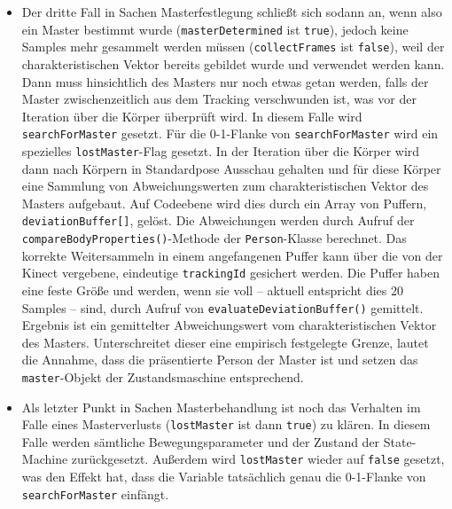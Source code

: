 \begin{itemize}
\item Der dritte Fall in Sachen Masterfestlegung schließt sich sodann an, wenn also ein Master bestimmt wurde (\texttt{masterDetermined} ist \texttt{true}), jedoch keine Samples mehr gesammelt werden müssen (\texttt{collectFrames} ist \texttt{false}), weil der charakteristischen Vektor bereits gebildet wurde und verwendet werden kann. Dann muss hinsichtlich des Masters nur noch etwas getan werden, falls der Master zwischenzeitlich aus dem Tracking verschwunden ist, was vor der Iteration über die Körper überprüft wird. In diesem Falle wird \texttt{searchForMaster} gesetzt. Für die 0-1-Flanke von \texttt{searchForMaster} wird ein spezielles \texttt{lostMaster}-Flag gesetzt. In der Iteration über die Körper wird dann nach Körpern in Standardpose Ausschau gehalten und für diese Körper eine Sammlung von Abweichungswerten zum charakteristischen Vektor des Masters aufgebaut. Auf Codeebene wird dies durch ein Array von Puffern, \texttt{deviationBuffer[]}, gelöst. Die Abweichungen werden durch Aufruf der \texttt{compareBodyProperties()}-Methode der \texttt{Person}-Klasse berechnet. Das korrekte Weitersammeln in einem angefangenen Puffer kann über die von der Kinect vergebene, eindeutige \texttt{trackingId} gesichert werden. Die Puffer haben eine feste Größe und werden, wenn sie voll -- aktuell entspricht dies 20 Samples -- sind, durch Aufruf von \texttt{evaluateDeviationBuffer()} gemittelt. Ergebnis ist ein gemittelter Abweichungswert vom charakteristischen Vektor des Masters. Unterschreitet dieser eine empirisch festgelegte Grenze, lautet die Annahme, dass die präsentierte Person der Master ist und setzen das \texttt{master}-Objekt der Zustandsmaschine entsprechend.\par 
\item Als letzter Punkt in Sachen Masterbehandlung ist noch das Verhalten im Falle eines Masterverlusts (\texttt{lostMaster} ist dann \texttt{true}) zu klären. In diesem Falle werden sämtliche Bewegungsparameter und der Zustand der State-Machine zurückgesetzt. Außerdem wird \texttt{lostMaster} wieder auf \texttt{false} gesetzt, was den Effekt hat, dass die Variable tatsächlich genau die 0-1-Flanke von \texttt{searchForMaster} einfängt.\par
\end{itemize}
